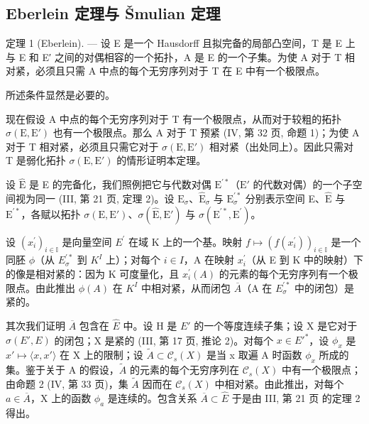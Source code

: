 \subsection{Eberlein 定理与 Šmulian 定理}

定理 1 (Eberlein). --- 设 E 是一个 Hausdorff 且拟完备的局部凸空间，T 是 E 上与 E 和 E′ 之间的对偶相容的一个拓扑，A 是 E 的一个子集。为使 A 对于 T 相对紧，必须且只需 A 中点的每个无穷序列对于 T 在 E 中有一个极限点。

所述条件显然是必要的。

现在假设 A 中点的每个无穷序列对于 T 有一个极限点，从而对于较粗的拓扑 \(\sigma(\mathrm{E}, \mathrm{E}')\) 也有一个极限点。那么 A 对于 T 预紧 (IV, 第 32 页, 命题 1)；为使 A 对于 T 相对紧，必须且只需它对于 \(\sigma(\mathrm{E}, \mathrm{E}')\) 相对紧（出处同上）。因此只需对 T 是弱化拓扑 \(\sigma(\mathrm{E}, \mathrm{E}')\) 的情形证明本定理。

设 \(\hat{\mathrm{E}}\) 是 E 的完备化，我们照例把它与代数对偶 \(\mathrm{E}^{\prime *}\)（\(\mathrm{E}'\) 的代数对偶）的一个子空间视为同一 (III, 第 21 页, 定理 2)。设 \(\mathrm{E}_{\sigma}\)、\(\hat{\mathrm{E}}_{\sigma}\) 与 \(\mathrm{E}_{\sigma}^{\prime *}\) 分别表示空间 E、\(\hat{\mathrm{E}}\) 与 \(\mathrm{E}^{\prime *}\)，各赋以拓扑 \(\sigma (\mathrm{E},\mathrm{E}')\)、\(\sigma (\hat{\mathrm{E}},\mathrm{E}')\) 与 \(\sigma (\mathrm{E}^{\prime *},\mathrm{E}^{\prime})\)。

设 \((x_{i}^{\prime})_{i\in\mathbb{I}}\) 是向量空间 \(E^{\prime}\) 在域 K 上的一个基。映射 \(f\mapsto(f(x_{i}^{\prime}))_{i\in\mathbb{I}}\) 是一个同胚 \(\phi\)（从 \(E_{\sigma}^{\prime*}\) 到 \(K^{I}\) 上）；对每个 \(i\in I\)，A 在映射 \(x_{i}^{\prime}\)（从 E 到 K 中的映射）下的像是相对紧的：因为 K 可度量化，且 \(x_{i}^{\prime}(A)\) 的元素的每个无穷序列有一个极限点。由此推出 \(\phi(A)\) 在 \(K^{I}\) 中相对紧，从而闭包 \(\overline{A}\)（A 在 \(E_{\sigma}^{\prime*}\) 中的闭包）是紧的。

其次我们证明 \(\overline{A}\) 包含在 \(\hat{E}\) 中。设 H 是 \(E'\) 的一个等度连续子集；设 X 是它对于 \(\sigma(E', E)\) 的闭包；X 是紧的 (III, 第 17 页, 推论 2)。对每个 \(x \in E'^{*}\)，设 \(\phi_{x}\) 是 \(x' \mapsto \langle x, x' \rangle\) 在 X 上的限制；设 \(\tilde{A} \subset \mathcal{C}_{s}(X)\) 是当 x 取遍 A 时函数 \(\phi_{x}\) 所成的集。鉴于关于 A 的假设，\(\tilde{A}\) 的元素的每个无穷序列在 \(\mathcal{C}_{s}(X)\) 中有一个极限点；由命题 2 (IV, 第 33 页)，集 \(\tilde{A}\) 因而在 \(\mathcal{C}_{s}(X)\) 中相对紧。由此推出，对每个 \(a \in \overline{A}\)，X 上的函数 \(\phi_{a}\) 是连续的。包含关系 \(\overline{A} \subset \hat{E}\) 于是由 III, 第 21 页 的定理 2 得出。

